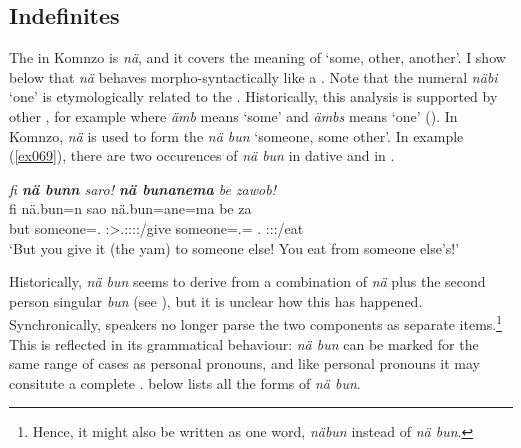 \subsection{Indefinites}\label{indefnae}

The   in Komnzo is \emph{nä}, and it covers the meaning of `some, other, another'. I show below that \emph{nä} behaves morpho-syntactically like a . Note that the numeral \emph{näbi} `one' is etymologically related to the . Historically, this analysis is supported by other , for example  where \emph{ämb} means `some' and \emph{ämbs} means `one' (\citealt{Evans:quant}). In Komnzo, \emph{nä} is used to form the   \emph{nä bun} `someone, some other'. In example (\ref{ex069}), there are two occurences of \emph{nä bun} in dative  and in  .

\begin{exe}
	\ex \emph{fi \textbf{nä bunn} saro! \textbf{nä bunanema} be zawob!}\\
	\gll fi {nä.bun=n} sao {nä.bun=ane=ma} be za\\
	but {someone=\Dat.\Sg} \Stsg:\Sbj{}>\Tsg{}.\Masc{}:\Io{}:\Imp{}:\Pfv{}:\Andat{}/give {someone=\Poss.\Sg=\Char{}} \Ssg{}.\Erg{} \Stsg{}:\Sbj:\Imp{}:\Pfv{}/eat\\
	\trans `But you give it (the yam) to someone else! You eat from someone else's!'\\ 
	\label{ex069}
\end{exe}%

Historically, \emph{nä bun} seems to derive from a combination of \emph{nä} plus the second person singular   \emph{bun} (see ), but it is unclear how this has happened. Synchronically, speakers no longer parse the two components as separate items.\footnote{Hence, it might also be written as one word, \emph{näbun} instead of \emph{nä bun}.} This is reflected in its grammatical behaviour: \emph{nä bun} can be marked for the same range of cases as personal pronouns, and like personal pronouns it may consitute a complete .  below lists all the  forms of \emph{nä bun}.%

